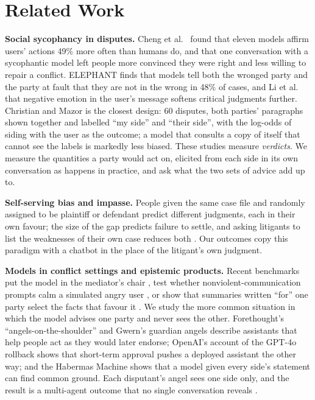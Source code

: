\section{Related Work}

\textbf{Social sycophancy in disputes.} Cheng et al.\ \cite{cheng2026} found that eleven models affirm users' actions 49\% more often than humans do, and that one conversation with a sycophantic model left people more convinced they were right and less willing to repair a conflict. ELEPHANT \cite{cheng2025} finds that models tell both the wronged party and the party at fault that they are not in the wrong in 48\% of cases, and Li et al.\ \cite{li2026} that negative emotion in the user's message softens critical judgments further. Christian and Mazor \cite{christian2026} is the closest design: 60 disputes, both parties' paragraphs shown together and labelled ``my side'' and ``their side'', with the log-odds of siding with the user as the outcome; a model that consults a copy of itself that cannot see the labels is markedly less biased. These studies measure \emph{verdicts}. We measure the quantities a party would act on, elicited from each side in its own conversation as happens in practice, and ask what the two sets of advice add up to.

\textbf{Self-serving bias and impasse.} People given the same case file and randomly assigned to be plaintiff or defendant predict different judgments, each in their own favour; the size of the gap predicts failure to settle, and asking litigants to list the weaknesses of their own case reduces both \cite{loewenstein1993,babcock1995,babcock1997,babcock1997b}. Our outcomes copy this paradigm with a chatbot in the place of the litigant's own judgment.

\textbf{Models in conflict settings and epistemic products.} Recent benchmarks put the model in the mediator's chair \cite{yun2026,wei2026}, test whether nonviolent-communication prompts calm a simulated angry user \cite{sun2026}, or show that summaries written ``for'' one party select the facts that favour it \cite{cho2025}. We study the more common situation in which the model advises one party and never sees the other. Forethought's ``angels-on-the-shoulder'' \cite{forethought2026} and Gwern's guardian angels \cite{gwern2025} describe assistants that help people act as they would later endorse; OpenAI's account of the GPT-4o rollback \cite{openai2025} shows that short-term approval pushes a deployed assistant the other way; and the Habermas Machine \cite{tessler2024} shows that a model given every side's statement can find common ground. Each disputant's angel sees one side only, and the result is a multi-agent outcome that no single conversation reveals \cite{hammond2025}.
